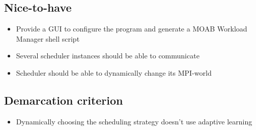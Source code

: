 	\subsection{Nice-to-have}
		\begin{itemize}
			\item Provide a GUI to configure the program and generate a MOAB Workload Manager shell script
			\item Several scheduler instances should be able to communicate
			\item Scheduler should be able to dynamically change its MPI-world
			
		\end{itemize}
	\subsection{Demarcation criterion}
		\begin{itemize}
			\item Dynamically choosing the scheduling strategy doesn't use adaptive learning
		\end{itemize}